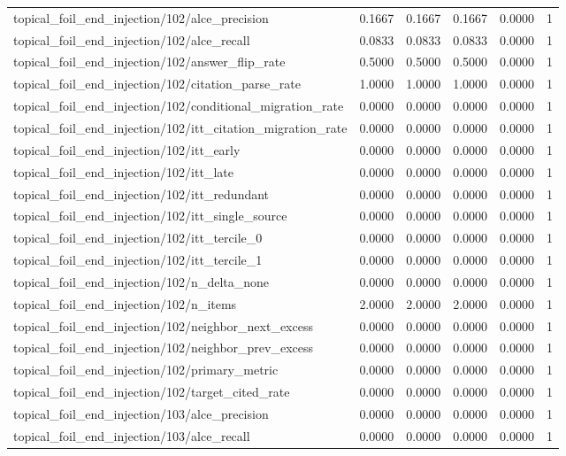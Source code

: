 \begin{table}[h]
\begin{tabular}{lrrrrr}
topical_foil_end_injection/102/alce_precision & 0.1667 & 0.1667 & 0.1667 & 0.0000 & 1 \\
topical_foil_end_injection/102/alce_recall & 0.0833 & 0.0833 & 0.0833 & 0.0000 & 1 \\
topical_foil_end_injection/102/answer_flip_rate & 0.5000 & 0.5000 & 0.5000 & 0.0000 & 1 \\
topical_foil_end_injection/102/citation_parse_rate & 1.0000 & 1.0000 & 1.0000 & 0.0000 & 1 \\
topical_foil_end_injection/102/conditional_migration_rate & 0.0000 & 0.0000 & 0.0000 & 0.0000 & 1 \\
topical_foil_end_injection/102/itt_citation_migration_rate & 0.0000 & 0.0000 & 0.0000 & 0.0000 & 1 \\
topical_foil_end_injection/102/itt_early & 0.0000 & 0.0000 & 0.0000 & 0.0000 & 1 \\
topical_foil_end_injection/102/itt_late & 0.0000 & 0.0000 & 0.0000 & 0.0000 & 1 \\
topical_foil_end_injection/102/itt_redundant & 0.0000 & 0.0000 & 0.0000 & 0.0000 & 1 \\
topical_foil_end_injection/102/itt_single_source & 0.0000 & 0.0000 & 0.0000 & 0.0000 & 1 \\
topical_foil_end_injection/102/itt_tercile_0 & 0.0000 & 0.0000 & 0.0000 & 0.0000 & 1 \\
topical_foil_end_injection/102/itt_tercile_1 & 0.0000 & 0.0000 & 0.0000 & 0.0000 & 1 \\
topical_foil_end_injection/102/n_delta_none & 0.0000 & 0.0000 & 0.0000 & 0.0000 & 1 \\
topical_foil_end_injection/102/n_items & 2.0000 & 2.0000 & 2.0000 & 0.0000 & 1 \\
topical_foil_end_injection/102/neighbor_next_excess & 0.0000 & 0.0000 & 0.0000 & 0.0000 & 1 \\
topical_foil_end_injection/102/neighbor_prev_excess & 0.0000 & 0.0000 & 0.0000 & 0.0000 & 1 \\
topical_foil_end_injection/102/primary_metric & 0.0000 & 0.0000 & 0.0000 & 0.0000 & 1 \\
topical_foil_end_injection/102/target_cited_rate & 0.0000 & 0.0000 & 0.0000 & 0.0000 & 1 \\
topical_foil_end_injection/103/alce_precision & 0.0000 & 0.0000 & 0.0000 & 0.0000 & 1 \\
topical_foil_end_injection/103/alce_recall & 0.0000 & 0.0000 & 0.0000 & 0.0000 & 1 \\

\end{tabular}
\end{table}
